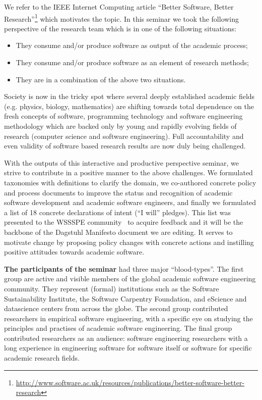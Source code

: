 \documentclass[a4paper,UKenglish]{dagrep}
\begin{document}
We refer to the IEEE Internet Computing article ``Better Software, Better Research''\footnote{\url{http://www.software.ac.uk/resources/publications/better-software-better-research}} which motivates the topic. In this seminar we took the following perspective of the research team which is in one of the following situations:
\begin{itemize}
\item They consume and/or produce software as output of the academic process;
\item They consume and/or produce software as an element of research methods;
\item They are in a combination of the above two situations.
\end{itemize}

Society is now in the tricky spot where several deeply established academic fields
(e.g. physics, biology, mathematics) are shifting towards total dependence on the fresh concepts of software, programming technology and software engineering methodology
which are backed only by young and rapidly evolving fields of research (computer science and software engineering).  Full accountability and even validity of software based research results are now duly being challenged.

With the outputs of this interactive and productive perspective seminar, we strive to contribute in a positive manner to the above challenges. We formulated taxonomies with definitions to clarify the domain, we co-authored concrete policy and process documents to improve the status and recognition of academic software development and academic software engineers, and finally we formulated a list of 18 concrete declarations of intent (``I will'' pledges). This list was presented to the WSSSPE community~\cite{wssspe} to acquire feedback and it will be the backbone of the Dagstuhl Manifesto document we are editing. It serves to motivate change by  proposing policy changes with concrete actions and instilling positive attitudes towards academic software.


\textbf{The participants of the seminar} had three major ``blood-types''. The first group are active and visible members of the global academic software engineering community. They represent (formal) institutions such as the Software Sustainability Institute, the Software Carpentry Foundation, and eScience and datascience centers from across the globe. The second group contributed researchers in empirical software engineering, with a specific eye on studying the principles and practises of academic software engineering. The final group contributed researchers as an audience: software engineering researchers with a long experience in engineering software for software itself or software for specific academic research fields.
\end{document}
